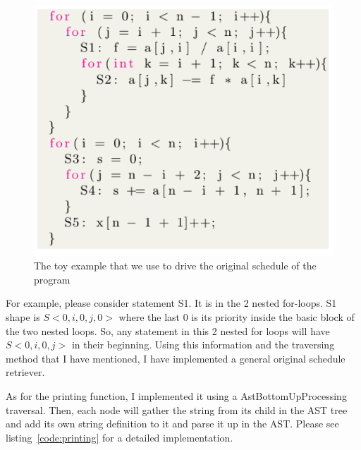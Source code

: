 \documentclass[letterpaper,12pt]{article}
\begin{document}
\begin{figure}[h!]
	\centering
	\includegraphics[scale=0.5]{fig/code.png}
	\caption{The toy example that we use to drive the original schedule of the program}
	\label{fig:code}
\end{figure}

For example, please consider statement S1. It is in the 2 nested for-loops. S1 shape is $S<0,i,0,j, 0>$ where the last 0 is its priority inside the basic block of the two nested loops. So, any statement in this 2 nested for loops will have $S<0,i,0,j>$ in their beginning. Using this information and the traversing method that I have mentioned, I have implemented a general original schedule retriever. 

As for the printing function, I implemented it using a AstBottomUpProcessing traversal. Then, each node will gather the string from its child in the AST tree and add its own string definition to it and parse it up in the AST. Please see listing~\ref{code:printing} for a detailed implementation.
\end{document}
